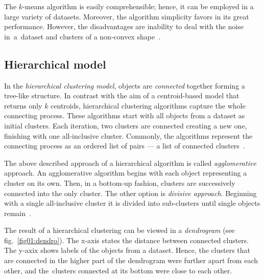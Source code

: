 The $k$-means algorithm is easily comprehensible; hence, it can be employed in a large variety of datasets. Moreover, the algorithm simplicity favors in its great performance. However, the disadvantages are inability to deal with the noise in~a~dataset and clusters of a non-convex shape~\cite{uppada2014centroid}.
  

\subsection{Hierarchical model}

In the \emph{hierarchical clustering model}, objects are \emph{connected} together forming a tree-like structure. In contrast with the aim of a centroid-based model that returns only $k$ centroids, hierarchical clustering algorithms capture the whole connecting process. These algorithms start with all objects from a dataset as initial clusters. Each iteration, two clusters are connected creating a new one, finishing with one all-inclusive cluster. Commonly, the algorithms represent the connecting process as an ordered list of pairs --- a list of connected clusters~\cite{karypis1999chameleon}.

The above described approach of a hierarchical algorithm is called \emph{agglomerative} approach. An agglomerative algorithm begins with each object representing a cluster on its own. Then, in a bottom-up fashion, clusters are successively connected into the only cluster. The other option is \emph{divisive approach}. Beginning with a single all-inclusive cluster it is divided into sub-clusters until single objects remain~\cite{rokach2005clustering}. 

The result of a hierarchical clustering can be viewed in a \emph{dendrogram} (see fig.~\ref{fig01:dendro}). The x-axis states the distance between connected clusters. The y-axix shows labels of the objects from a dataset. Hence, the clusters that are connected in the higher part of the dendrogram were further apart from each other, and the~clusters connected at its bottom were close to each other.

